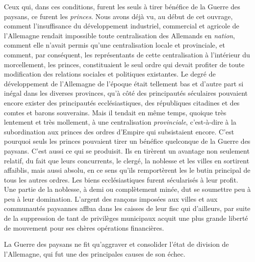 \documentclass[french,twoside]{book} %
\begin{document}
Ceux qui, dans ces conditions, furent les seuls à tirer bénéfice de la Guerre des paysans, ce furent les \emph{princes}. Nous avons déjà vu, au début de cet ouvrage, comment l’insuffisance du développement industriel, commercial et agricole de l’Allemagne rendait impossible toute centralisation des Allemands en \emph{nation}, comment elle n’avait permis qu’une centralisation locale et provinciale, et comment, par conséquent, les représentants de cette centralisation à l’intérieur du morcellement, les princes, constituaient le seul ordre qui devait profiter de toute modification des relations sociales et politiques existantes. Le degré de développement de l’Allemagne de l’époque était tellement bas et d’autre part si inégal dans les diverses provinces, qu’à côté des principautés séculaires pouvaient encore exister des principautés ecclésiastiques, des républiques citadines et des comtes et barons souverains. Mais il tendait en même temps, quoique très lentement et très mollement, à une centralisation \emph{provinciale}, c’est-à-dire à la subordination aux princes des ordres d’Empire qui subsistaient encore. C’est pourquoi seuls les princes pouvaient tirer un bénéfice quelconque de la Guerre des paysans. C’est aussi ce qui se produisit. Ils en tirèrent un avantage non seulement relatif, du fait que leurs concurrents, le clergé, la noblesse et les villes en sortirent affaiblis, mais aussi absolu, en ce sens qu’ils remportèrent les le butin principal de tous les autres ordres. Les biens ecclésiastiques furent sécularisés à leur profit. Une partie de la noblesse, à demi ou complètement minée, dut se soumettre peu à peu à leur domination. L’argent des rançons imposées aux villes et aux communautés paysannes afflua dans les caisses de leur fisc qui d’ailleurs, par suite de la suppression de tant de privilèges municipaux acquit une plus grande liberté de mouvement pour ses chères opérations financières.\par
La Guerre des paysans ne fit qu’aggraver et consolider l’état de division de l’Allemagne, qui fut une des principales causes de son échec.\par
\end{document}
